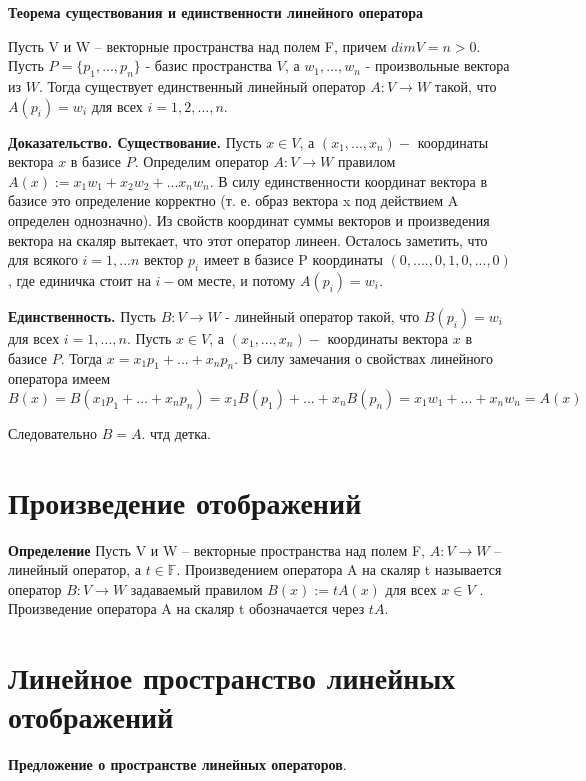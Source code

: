 \documentclass[a4paper]{article}
\begin{document}
\textbf{Теорема существования и единственности линейного оператора}

Пусть V и W – векторные пространства над полем F, причем $dim V = n > 0$. Пусть $P = \{ p_1, ..., p_n \}$ - базис пространства $V$, а $w_1, ..., w_n$ - произвольные вектора из $W$.  Тогда существует
единственный линейный оператор $A: V \rightarrow W$ такой, что $A(p_i) = w_i$ для всех $i = 1, 2, ..., n$.

\textbf{Доказательство. Существование.} Пусть $x \in V$, а $(x_1, ..., x_n) - $ координаты вектора $x$ в базисе $P$. Определим оператор $A: V \rightarrow W$ правилом $A(x) := x_1w_1+x_2w_2+...x_nw_n$. В силу единственности координат вектора в базисе это определение корректно (т. е. образ вектора x под действием A определен однозначно). Из свойств координат суммы векторов и произведения вектора на скаляр вытекает, что этот оператор
линеен. Осталось заметить, что для всякого $i = 1,...n$ вектор $p_i$ имеет в базисе P координаты $(0,....,0,1,0,...,0)$, где единичка стоит на $i-$ом месте, и потому $A(p_i) = w_i$.

\textbf{Единственность.} Пусть $B: V \rightarrow W$ - линейный оператор такой, что $B(p_i) = w_i$ для всех $i = 1,...,n$. Пусть $x \in V$, а $(x_1, ..., x_n) - $ координаты вектора $x$ в базисе $P$. Тогда $x = x_1p_1 + ... + x_np_n$. В силу замечания о свойствах линейного оператора имеем
\begin{equation}
B(x) = B(x_1p_1 + ... + x_np_n) = x_1B(p_1) + ... + x_nB(p_n) = x_1w_1 + ... + x_nw_n = A(x)
\end{equation}

Следовательно $B=A$. чтд детка.





\section*{Произведение отображений}
\textbf{Определение} Пусть V и W – векторные пространства над полем F, $A: V \rightarrow W$ –
линейный оператор, а $t \in \mathbb{F}$. Произведением оператора A на скаляр t
называется оператор $B: V \rightarrow W$ задаваемый правилом $B(x) := tA(x)$ для
всех $x \in V$ . Произведение оператора A на скаляр t обозначается через $tA$.


\section*{Линейное пространство линейных отображений}
\textbf{Предложение о пространстве линейных операторов}.
\end{document}
